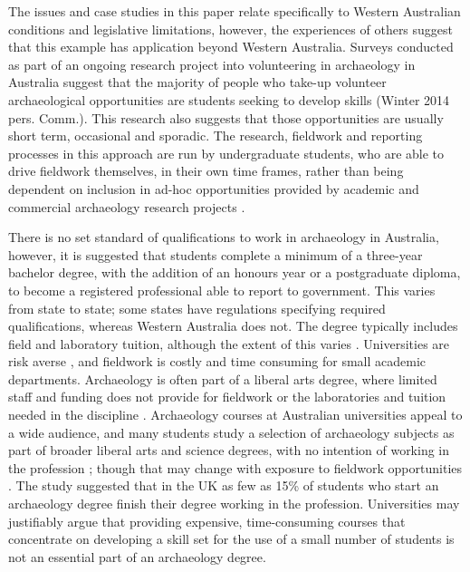 \documentclass{ijsra}
\begin{document}
The issues and case studies in this paper relate specifically to Western Australian conditions and legislative limitations, however, the experiences of others \parencites[e.g.][]{boytner2012}{mytum2012a}{mytum2012b}{scarlett2012} suggest that this example has application beyond Western Australia.
Surveys conducted as part of an ongoing research project into volunteering in archaeology in Australia suggest that the majority of people who take-up volunteer archaeological opportunities are students seeking to develop skills (Winter 2014 pers. Comm.).
This research also suggests that those opportunities are usually short term, occasional and sporadic. 
The research, fieldwork and reporting processes in this approach are run by undergraduate students, who are able to drive fieldwork themselves, in their own time frames, rather than being dependent on inclusion in ad-hoc opportunities provided by academic and commercial archaeology research projects \parencites[see][90]{boytner2012}[222]{clark2012}[70-72]{colley2012}. 


There is no set standard of qualifications to work in archaeology in Australia, however, it is suggested that students complete a minimum of a three-year bachelor degree, with the addition of an honours year or a postgraduate diploma, to become a registered professional able to report to government. 
This varies from state to state; some states have regulations specifying required qualifications, whereas Western Australia does not. 
The degree typically includes field and laboratory tuition, although the extent of this varies \parencite{gibbs2005}. 
Universities are risk averse \parencite[6]{boytner2012}, and fieldwork is costly and time consuming for small academic departments. 
Archaeology is often part of a liberal arts degree, where limited staff and funding does not provide for fieldwork or the laboratories and tuition needed in the discipline \parencites{colley2004}{colley2012}{gibbs2005}{cosgrove2013}. 
Archaeology courses at Australian universities appeal to a wide audience, and many students study a selection of archaeology subjects as part of broader liberal arts and science degrees, with no intention of working in the profession \parencites[28]{gibbs2005}[44]{cosgrove2013}; 
though that may change with exposure to fieldwork opportunities \parencite[29]{cobb2012}. 
The \textcite[31]{cobb2012} study suggested that in the UK as few as 15\% of students who start an archaeology degree finish their degree working in the profession. 
Universities may justifiably argue that providing expensive, time-consuming courses that concentrate on developing a skill set for the use of a small number of students is not an essential part of an archaeology degree.
\end{document}
